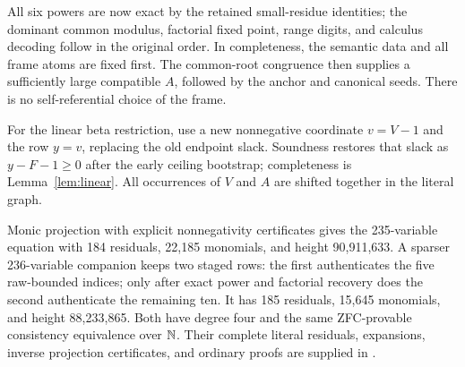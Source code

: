 All six powers are now exact by the retained small-residue identities;
the dominant common modulus, factorial fixed point, range digits, and
calculus decoding follow in the original order. In completeness, the
semantic data and all frame atoms are fixed first. The common-root
congruence then supplies a sufficiently large compatible $A$, followed
by the anchor and canonical seeds. There is no self-referential choice
of the frame.

For the linear beta restriction, use a new nonnegative coordinate
$v=V-1$ and the row $y=v$, replacing the old endpoint slack.
Soundness restores that slack as $y-F-1\ge0$ after the early ceiling
bootstrap; completeness is Lemma~\ref{lem:linear}. All occurrences of
$V$ and $A$ are shifted together in the literal graph.

Monic projection with explicit nonnegativity certificates gives the
235-variable equation with 184 residuals, 22,185 monomials, and height
90,911,633. A sparser 236-variable companion keeps two staged rows:
the first authenticates the five raw-bounded indices; only after exact
power and factorial recovery does the second authenticate the remaining
ten. It has 185 residuals, 15,645 monomials, and height 88,233,865.
Both have degree four and the same ZFC-provable consistency equivalence
over $\mathbb N$. Their complete literal residuals, expansions, inverse
projection certificates, and ordinary proofs are supplied in
.
